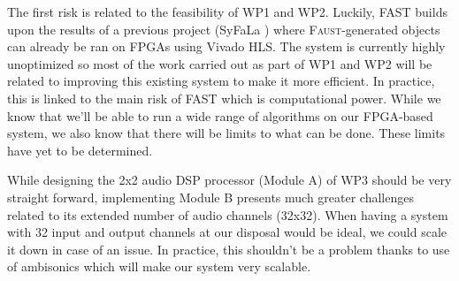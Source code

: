 \documentclass[a4paper,9pt]{extarticle}
\newcommand{\F}{\textsc{Faust}}
\newcommand{\PP}{FAST}
\begin{document}

The first risk is related to the feasibility of WP1 and WP2. Luckily, \PP{} builds upon the results of a previous project (SyFaLa \cite{risset2020}) where \F{}-generated objects can already be ran on FPGAs using Vivado HLS. The system is currently highly unoptimized so most of the work carried out as part of WP1 and WP2 will be related to improving this existing system to make it more efficient. In practice, this is linked to the main risk of \PP{} which is computational power. While we know that we'll be able to run a wide range of algorithms on our FPGA-based system, we also know that there will be limits to what can be done. These limits have yet to be determined.  

While designing the 2x2 audio DSP processor (Module A) of WP3 should be very straight forward, implementing Module B presents much greater challenges related to its extended number of audio channels (32x32). When having a system with 32 input and output channels at our disposal would be ideal, we could scale it down in case of an issue. In practice, this shouldn't be a problem thanks to use of ambisonics which will make our system very scalable.
\end{document}

